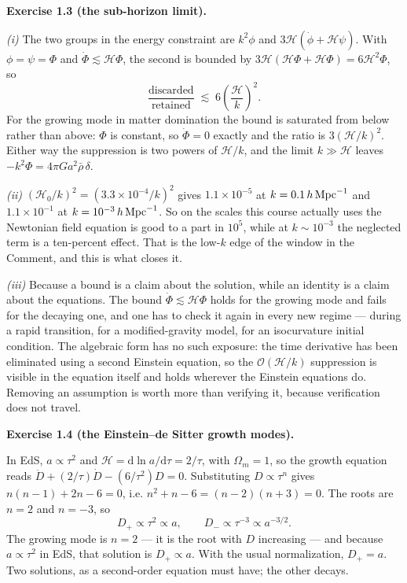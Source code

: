\documentclass[a4paper,11pt]{article}
\def\cH{\mathcal{H}}
\newcommand{\dd}{\mathrm{d}}
\def\Om{\Omega_m}
\newenvironment{solution}[1]
  {\par\medskip\noindent\textbf{#1}\par\nobreak\smallskip}
  {\par\medskip}
\begin{document}
\begin{solution}{Exercise 1.3 (the sub-horizon limit).}
\emph{(i)} The two groups in the energy constraint are $k^2\phi$ and
$3\cH(\dot\phi + \cH\psi)$. With $\phi=\psi=\Phi$ and $\dot\Phi \lesssim \cH\Phi$,
the second is bounded by $3\cH(\cH\Phi + \cH\Phi) = 6\cH^2\Phi$, so
\begin{equation*}
\frac{\text{discarded}}{\text{retained}} \;\lesssim\; 6\left(\frac{\cH}{k}\right)^2 .
\end{equation*}
For the growing mode in matter domination the bound is saturated from below
rather than above: $\Phi$ is constant, so $\dot\Phi = 0$ exactly and the ratio is
$3(\cH/k)^2$. Either way the suppression is two powers of $\cH/k$, and the limit
$k \gg \cH$ leaves $-k^2\Phi = 4\pi Ga^2\bar\rho\,\delta$.

\emph{(ii)} $(\cH_0/k)^2 = (3.3\times10^{-4}/k)^2$ gives $1.1\times10^{-5}$ at
$k = 0.1\,h\,{\rm Mpc}^{-1}$ and $1.1\times10^{-1}$ at
$k = 10^{-3}\,h\,{\rm Mpc}^{-1}$. So on the scales this course actually uses the
Newtonian field equation is good to a part in $10^5$, while at
$k \sim 10^{-3}$ the neglected term is a ten-percent effect. That is the
low-$k$ edge of the window in the Comment, and this is what closes it.

\emph{(iii)} Because a bound is a claim about the solution, while an identity is
a claim about the equations. The bound $\dot\Phi \lesssim \cH\Phi$ holds for the
growing mode and fails for the decaying one, and one has to check it again in
every new regime --- during a rapid transition, for a modified-gravity model, for
an isocurvature initial condition. The algebraic form has no such exposure: the
time derivative has been eliminated using a second Einstein equation, so the
$\mathcal{O}(\cH/k)$ suppression is visible in the equation itself and holds
wherever the Einstein equations do. Removing an assumption is worth more than
verifying it, because verification does not travel.
\end{solution}

\begin{solution}{Exercise 1.4 (the Einstein--de Sitter growth modes).}
In EdS, $a \propto \tau^2$ and $\cH = \dd\ln a/\dd\tau = 2/\tau$, with
$\Om = 1$, so the growth equation reads
$\ddot D + (2/\tau)\dot D - (6/\tau^2)D = 0$. Substituting $D \propto \tau^n$
gives $n(n-1) + 2n - 6 = 0$, i.e. $n^2 + n - 6 = (n-2)(n+3) = 0$. The roots are
$n = 2$ and $n = -3$, so
\begin{equation*}
D_+ \propto \tau^2 \propto a ,
\qquad
D_- \propto \tau^{-3} \propto a^{-3/2} .
\end{equation*}
The growing mode is $n = 2$ --- it is the root with $D$ increasing --- and
because $a \propto \tau^2$ in EdS, that solution is $D_+ \propto a$. With the
usual normalization, $D_+ = a$. Two solutions, as a second-order equation must
have; the other decays.
\end{solution}
\end{document}
